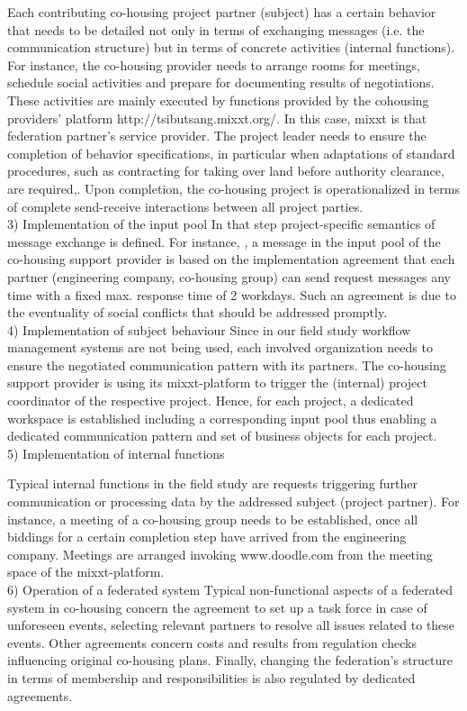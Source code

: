 Each contributing co-housing project partner (subject) has a certain behavior that needs to be detailed not only in terms of exchanging messages (i.e. the communication structure) but in terms of concrete activities (internal functions). For instance, the co-housing provider needs to arrange rooms for meetings, schedule social activities and prepare for documenting results of negotiations. These activities are mainly executed by functions provided by the cohousing providers’ platform http://tsibutsang.mixxt.org/. In this case, mixxt is that federation partner’s service provider. The project leader needs to ensure the completion of behavior specifications, in particular when adaptations of standard procedures, such as contracting for taking over land before authority clearance, are required,. Upon completion, the co-housing project is operationalized in terms of complete send-receive interactions between all project parties. 
\\
3)	Implementation of the input pool
In that step project-specific semantics of message exchange is defined. For instance, , a message in the input pool of the co-housing support provider is based on the implementation agreement that each partner (engineering company, co-housing group) can send request messages  any time with a fixed max. response time of 2 workdays. Such an agreement is due to the eventuality of social conflicts that should be addressed promptly. 
\\
4)	Implementation of subject behaviour
Since in our field study workflow management systems are not being used, each involved organization needs to ensure the negotiated communication pattern with its partners. The co-housing support provider is using its mixxt-platform to trigger the (internal) project coordinator of the respective project. Hence, for each project, a dedicated workspace is established including a corresponding input pool thus enabling a dedicated communication pattern and set of business objects for each project.
\\
5)	Implementation of internal functions

Typical internal functions in the field study are requests triggering further communication or processing data by the addressed subject (project partner). For instance, a meeting of a co-housing group needs to be established, once all biddings for a certain completion step have arrived from the engineering company. Meetings are arranged invoking www.doodle.com  from the meeting space of the mixxt-platform.
\\
6)	Operation of a federated system
Typical non-functional aspects of a federated system in co-housing concern the agreement to set up a task force in case of unforeseen events, selecting relevant partners to resolve all issues related to these events. Other agreements concern costs and results from regulation checks influencing original co-housing plans. Finally, changing the federation’s structure in terms of membership and responsibilities is also regulated by dedicated agreements.

